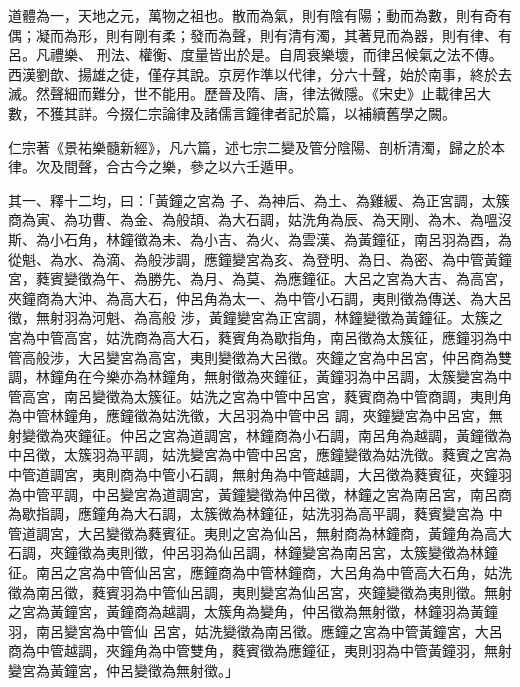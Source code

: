 
\begin{pinyinscope}

 道體為一，天地之元，萬物之祖也。散而為氣，則有陰有陽；動而為數，則有奇有偶；凝而為形，則有剛有柔；發而為聲，則有清有濁，其著見而為器，則有律、有呂。凡禮樂、
 刑法、權衡、度量皆出於是。自周衰樂壞，而律呂候氣之法不傳。西漢劉歆、揚雄之徒，僅存其說。京房作準以代律，分六十聲，始於南事，終於去滅。然聲細而難分，世不能用。歷晉及隋、唐，律法微隱。《宋史》止載律呂大數，不獲其詳。今掇仁宗論律及諸儒言鐘律者記於篇，以補續舊學之闕。



 仁宗著《景祐樂髓新經》，凡六篇，述七宗二變及管分陰陽、剖析清濁，歸之於本律。次及間聲，合古今之樂，參之以六壬遁甲。



 其一、釋十二均，曰：「黃鐘之宮為
 子、為神后、為土、為雞緩、為正宮調，太簇商為寅、為功曹、為金、為般頡、為大石調，姑洗角為辰、為天剛、為木、為嗢沒斯、為小石角，林鐘徵為未、為小吉、為火、為雲漢、為黃鐘征，南呂羽為酉，為從魁、為水、為滴、為般涉調，應鐘變宮為亥、為登明、為日、為密、為中管黃鐘宮，蕤賓變徵為午、為勝先、為月、為莫、為應鐘征。大呂之宮為大吉、為高宮，夾鐘商為大沖、為高大石，仲呂角為太一、為中管小石調，夷則徵為傳送、為大呂徵，無射羽為河魁、為高般
 涉，黃鐘變宮為正宮調，林鐘變徵為黃鐘征。太簇之宮為中管高宮，姑洗商為高大石，蕤賓角為歇指角，南呂徵為太簇征，應鐘羽為中管高般涉，大呂變宮為高宮，夷則變徵為大呂徵。夾鐘之宮為中呂宮，仲呂商為雙調，林鐘角在今樂亦為林鐘角，無射徵為夾鐘征，黃鐘羽為中呂調，太簇變宮為中管高宮，南呂變徵為太簇征。姑洗之宮為中管中呂宮，蕤賓商為中管商調，夷則角為中管林鐘角，應鐘徵為姑洗徵，大呂羽為中管中呂
 調，夾鐘變宮為中呂宮，無射變徵為夾鐘征。仲呂之宮為道調宮，林鐘商為小石調，南呂角為越調，黃鐘徵為中呂徵，太簇羽為平調，姑洗變宮為中管中呂宮，應鐘變徵為姑洗徵。蕤賓之宮為中管道調宮，夷則商為中管小石調，無射角為中管越調，大呂徵為蕤賓征，夾鐘羽為中管平調，中呂變宮為道調宮，黃鐘變徵為仲呂徵，林鐘之宮為南呂宮，南呂商為歇指調，應鐘角為大石調，太簇微為林鐘征，姑洗羽為高平調，蕤賓變宮為
 中管道調宮，大呂變徵為蕤賓征。夷則之宮為仙呂，無射商為林鐘商，黃鐘角為高大石調，夾鐘徵為夷則徵，仲呂羽為仙呂調，林鐘變宮為南呂宮，太簇變徵為林鐘征。南呂之宮為中管仙呂宮，應鐘商為中管林鐘商，大呂角為中管高大石角，姑洗徵為南呂徵，蕤賓羽為中管仙呂調，夷則變宮為仙呂宮，夾鐘變徵為夷則徵。無射之宮為黃鐘宮，黃鐘商為越調，太簇角為變角，仲呂徵為無射徵，林鐘羽為黃鐘羽，南呂變宮為中管仙
 呂宮，姑洗變徵為南呂徵。應鐘之宮為中管黃鐘宮，大呂商為中管越調，夾鐘角為中管雙角，蕤賓徵為應鐘征，夷則羽為中管黃鐘羽，無射變宮為黃鐘宮，仲呂變徵為無射徵。」




\end{pinyinscope}
